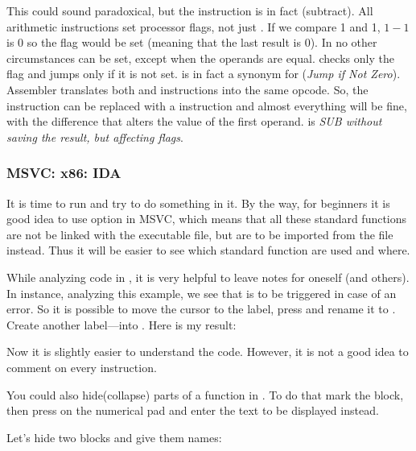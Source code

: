 \label{CMPandSUB}
This could sound paradoxical, but the \CMP instruction is in fact \SUB (subtract).
All arithmetic instructions set processor flags, not just \CMP.
If we compare 1 and 1, $1-1$ is 0 so the \ZF flag would be set (meaning that the last result is 0).
In no other circumstances \ZF can be set, except when the operands are equal.
\JNE checks only the \ZF flag and jumps only if it is not set.  \JNE is in fact a synonym for \JNZ (\emph{Jump if Not Zero}).
Assembler translates both \JNE and \JNZ instructions into the same opcode.
So, the \CMP instruction can be replaced with a \SUB instruction and almost everything will be fine, with the difference that \SUB alters the value of the first operand.
\CMP is \emph{SUB without saving the result, but affecting flags}.

\subsubsection{MSVC: x86: IDA}

It is time to run \IDA and try to do something in it.
By the way, for beginners it is good idea to use  option in MSVC, which means that all these
standard functions are not be linked with the executable file, 
but are to be imported from the  file instead.
Thus it will be easier to see which standard function are used and where.

While analyzing code in \IDA, it is very helpful to leave notes for oneself (and others).
In instance, analyzing this example, 
we see that  is to be triggered in case of an error.
So it is possible to move the cursor to the label, press  and rename it to .
Create another label---into .
Here is my result:



Now it is slightly easier to understand the code.
However, it is not a good idea to comment on every instruction.

You could also hide(collapse) parts of a function in \IDA.
To do that mark the block, then press \q{--} on the numerical pad and enter the text to be displayed instead.

Let's hide two blocks and give them names:



